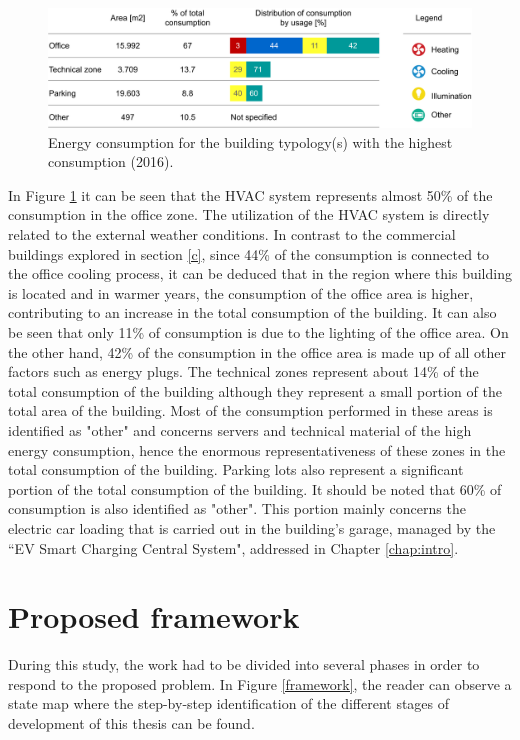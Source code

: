 \begin{figure}[h!]
    \centering
    \begin{center}
    \includegraphics[width=1\textwidth]{Images/ConsumoEDP.png}
    \caption{Energy consumption for the building typology(s) with the highest consumption (2016).}
    \label{consedp}
    \end{center}
\end{figure}
In Figure \ref{consedp} it can be seen that the \ac{HVAC} system represents almost 50\% of the consumption in the office zone. The utilization of the \ac{HVAC} system is directly related to the external weather conditions. In contrast to the commercial buildings explored in section \ref{c}, since 44\% of the consumption is connected to the office cooling process, it can be deduced that in the region where this building is located and in warmer years, the consumption of the office area is higher, contributing to an increase in the total consumption of the building. It can also be seen that only 11\% of consumption is due to the lighting of the office area. On the other hand, 42\% of the consumption in the office area is made up of all other factors such as energy plugs. The technical zones represent about 14\% of the total consumption of the building although they represent a small portion of the total area of the building. Most of the consumption performed in these areas is identified as "other" and concerns servers and technical material of the high energy consumption, hence the enormous representativeness of these zones in the total consumption of the building. Parking lots also represent a significant portion of the total consumption of the building. It should be noted that 60\% of consumption is also identified as "other". This portion mainly concerns the electric car loading that is carried out in the building's garage, managed by the “\ac{EV} Smart Charging Central System", addressed in Chapter \ref{chap:intro}.

\section{Proposed framework}\label{propfram}
During this study, the work had to be divided into several phases in order to respond to the proposed problem. In Figure \ref{framework}, the reader can observe a state map where the step-by-step identification of the different stages of development of this thesis can be found.


